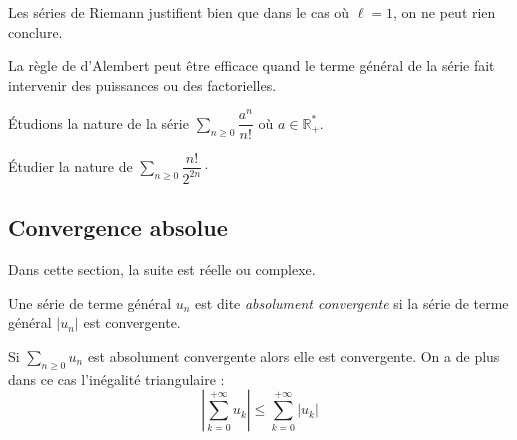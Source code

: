 \documentclass[french,11pt,twoside]{VcCours}
\newcommand{\Sum}[2]{\ensuremath{\textstyle{\sum\limits_{#1}^{#2}}}}
\begin{document}
\begin{rems}
\item Les séries de Riemann justifient bien que dans le cas où $\ell=1$, on ne peut rien conclure.
\item La règle de d'Alembert peut être efficace quand le terme général de la série fait intervenir des puissances ou des factorielles.
\end{rems}

\begin{ex} Étudions la nature de la série $\Sum{n \geq 0}{} \dfrac{a^n}{n!}$ où $a \in \mathbb{R}_+^{*}$.

\vspace{3cm}
\end{ex}

\begin{exa} Étudier la nature de $\Sum{n \geq 0}{} \dfrac{n!}{2^{2n}}\cdot$
\end{exa}
\subsection{Convergence absolue}

Dans cette section, la suite est réelle ou complexe.

\begin{defin} Une série de terme général $u_n$ est dite \textit{absolument convergente} si la série de terme général $\vert u_n \vert$ est convergente.
\end{defin}

\begin{thm} Si $\Sum{n \geq 0}{} u_n$ est absolument convergente alors elle est convergente. On a de plus dans ce cas l'inégalité triangulaire :
$$ \left\vert \sum_{k=0}^{+ \infty} u_k \right\vert \leq \sum_{k=0}^{+ \infty} \vert u_k \vert$$
\end{thm}
\end{document}
